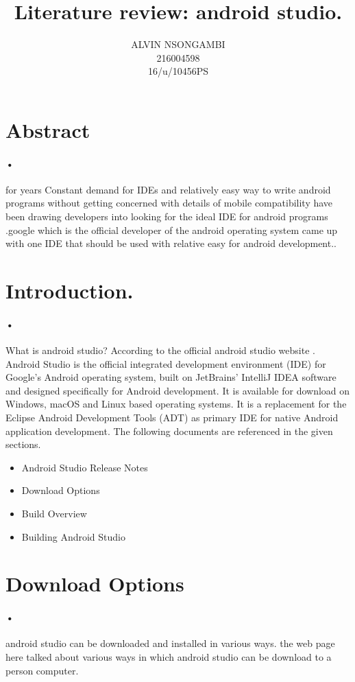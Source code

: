 \documentclass[8pt]{article}
\title{Literature review: android studio.}
\author{ALVIN NSONGAMBI\\216004598\\16/u/10456PS}
\begin{document}
	\maketitle
\section{Abstract}
\paragraph{•}
for years Constant demand for IDEs and relatively easy way to write android programs without getting concerned with details of mobile compatibility  have been drawing developers into looking for the ideal IDE for android programs .google which is the official developer of the android operating system came up with one IDE that should be used with relative easy for android development..
\section{Introduction.}
\paragraph{•}
What is android studio?
According to the official android studio website \cite{developer.android.com - android developers}.
Android Studio is the official integrated development environment (IDE) for Google's Android operating system, built on JetBrains' IntelliJ IDEA software and designed specifically for Android development. It is available for download on Windows, macOS and Linux based operating systems. It is a replacement for the Eclipse Android Development Tools (ADT) as primary IDE for native Android application development.
The following documents are referenced in the given sections.
	\begin{itemize}
       \item Android Studio Release Notes
	   \item Download Options
	   \item Build Overview
	   \item Building Android Studio
	\end{itemize}
\section{Download Options}
\paragraph{•}
android studio can be downloaded and installed in various ways.
the web page here talked about various ways in which android studio can be download to a person computer.
\end{document}
